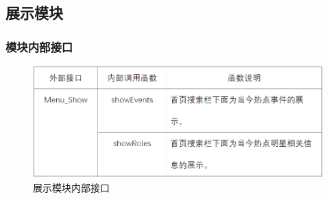 \subsection{展示模块}
\subsubsection{模块内部接口}
\begin{figure}[!htbp]
	\centering
	\includegraphics[scale=0.7]{image/b7.png} %
	\caption{展示模块内部接口} %
\end{figure}
